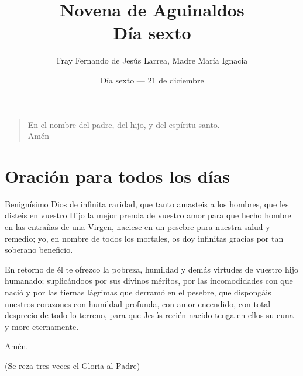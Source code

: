 \documentclass[spanish,utf8,12pt,twocolumn]{chlart}
\title{Novena de Aguinaldos\\Día sexto}
\author{Fray Fernando de Jesús Larrea, Madre María Ignacia}
\date{Día sexto --- 21 de diciembre}
\newenvironment{lectura}{\begingroup\color{lector}}{\endgroup\par}
\newenvironment{finalnotes}{\begingroup
	\footnotesize\sffamily\color{Gray}%
	\setlength{\leftskip}{3em}\setlength{\rightskip}{3em}\noindent
	}{\par\endgroup}
\newenvironment{gozo}{\begin{verse}\color{lector}}{\end{verse}}
\begin{document}
\maketitle

\begin{gozo}
En el nombre del padre, del hijo, y del espíritu santo.\\Amén
\end{gozo}
\section{Oración para todos los días}

\begin{lectura}
Benignísimo Dios de infinita caridad, que tanto amasteis a los hombres,
que les disteis en vuestro Hijo la mejor prenda de vuestro amor para que
hecho hombre en las entrañas de una Virgen, naciese en un pesebre para
nuestra salud y remedio; yo, en nombre de todos los mortales, os doy
infinitas gracias por tan soberano beneficio.

En retorno de él te ofrezco la pobreza, humildad y demás virtudes de
vuestro hijo humanado; suplicándoos por sus divinos méritos, por las
incomodidades con que nació y por las tiernas lágrimas que derramó en
el pesebre, que dispongáis nuestros corazones con humildad profunda,
con amor encendido, con total desprecio de todo lo terreno, para que
Jesús recién nacido tenga en ellos su cuna y more eternamente.

Amén.
\end{lectura}
\begin{finalnotes}
(Se reza tres veces el Gloria al Padre)
\end{finalnotes}

\newpage
\end{document}

